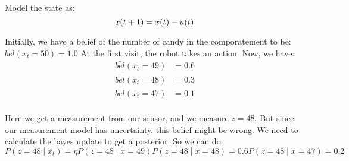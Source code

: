 Model the state as:
\begin{equation}
  x(t+1) = x(t) - u(t) \\
  \label{eq:State Model}
\end{equation}

Initially, we have a belief of the number of candy in the comporatement to be: $bel(x_t=50) = 1.0$
At the first visit, the robot takes an action. Now, we have:
\begin{align*}
  \bar{bel}(x_t=49) &= 0.6 \\
  \bar{bel}(x_t=48) &= 0.3 \\
  \bar{bel}(x_t=47) &= 0.1 \\
\end{align*}

Here we get a measurement from our sensor, and we measure $z = 48$. But since our measurement model has uncertainty, this belief might be wrong.
We need to calculate the bayes update to get a posterior. So we can do:
\begin{equation}
  P(z=48 \mid x_t) = \eta P(z=48 \mid x=49)
  P(z=48 \mid x=48) = 0.6
  P(z=48 \mid x=47) = 0.2
  \label{eq:}
\end{equation}

%
%
%
%
%
%
%
%
%
%
%


